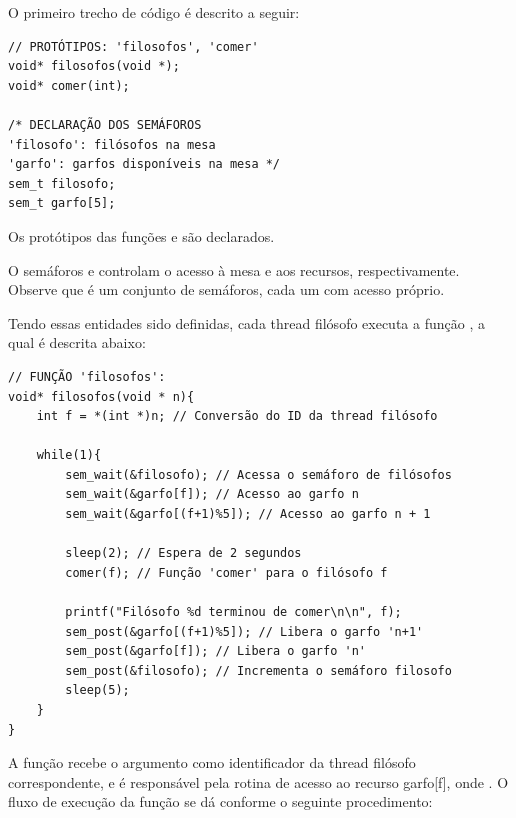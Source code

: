\documentclass[
	12pt,				%
	openright,			%
	oneside,			%
	a4paper,			%
	chapter=TITLE,		%
	english,			%
	french,				%
	spanish,			%
	brazil				%
	]{abntex2}
\theoremstyle{definition}
\begin{document}
O primeiro trecho de código é descrito a seguir:

\begin{verbatim}
// PROTÓTIPOS: 'filosofos', 'comer' 
void* filosofos(void *);
void* comer(int);

/* DECLARAÇÃO DOS SEMÁFOROS
'filosofo': filósofos na mesa
'garfo': garfos disponíveis na mesa */
sem_t filosofo;
sem_t garfo[5];
\end{verbatim}

Os protótipos das funções  e  são declarados.

O semáforos  e  controlam o acesso à mesa e aos recursos, respectivamente. Observe que  é um conjunto de semáforos, cada um com acesso próprio. 

Tendo essas entidades sido definidas, cada thread filósofo executa a função , a qual é descrita abaixo:

\begin{verbatim}
// FUNÇÃO 'filosofos':
void* filosofos(void * n){
    int f = *(int *)n; // Conversão do ID da thread filósofo

    while(1){
        sem_wait(&filosofo); // Acessa o semáforo de filósofos
        sem_wait(&garfo[f]); // Acesso ao garfo n
        sem_wait(&garfo[(f+1)%5]); // Acesso ao garfo n + 1

        sleep(2); // Espera de 2 segundos
        comer(f); // Função 'comer' para o filósofo f

        printf("Filósofo %d terminou de comer\n\n", f);
        sem_post(&garfo[(f+1)%5]); // Libera o garfo 'n+1'
        sem_post(&garfo[f]); // Libera o garfo 'n'
        sem_post(&filosofo); // Incrementa o semáforo filosofo
        sleep(5);
    }
}
\end{verbatim}

A função  recebe o argumento  como identificador da thread filósofo correspondente, e é responsável pela rotina de acesso ao recurso garfo[f], onde . O fluxo de execução da função se dá conforme o seguinte procedimento:
\end{document}
